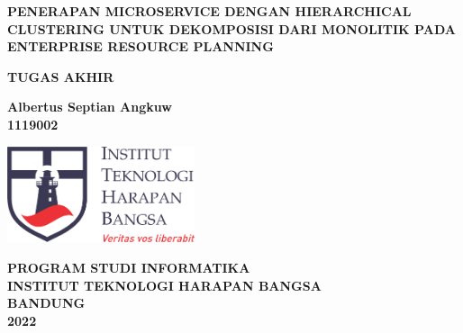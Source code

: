 \begin{titlepage}
	\begin{center}
		\vspace*{0cm}
		
		{\large \bfseries PENERAPAN MICROSERVICE DENGAN HIERARCHICAL CLUSTERING UNTUK DEKOMPOSISI DARI MONOLITIK PADA ENTERPRISE RESOURCE PLANNING \\}
			
		\vspace{3cm}
		
	 	{\large \bfseries TUGAS AKHIR}

		\vspace{2.5cm}
		
		{ \bfseries Albertus Septian Angkuw \\ 1119002 }
		
	
		\vspace*{\fill} 
		
		\includegraphics[width=5.5cm]{img/ithb.png}
	
		\vspace{2.5cm}

		{\large \bfseries PROGRAM STUDI INFORMATIKA \\
		INSTITUT TEKNOLOGI HARAPAN BANGSA \\
		BANDUNG\\
		2022}
		
		\vspace{1cm}
	\end{center}
\end{titlepage}